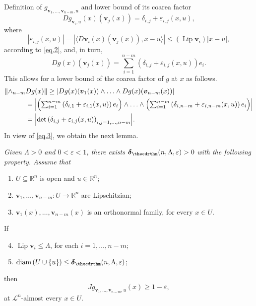 \documentclass[JEP,XML,SOM,Unicode,ThmDefs,NoEqCountersInSection]{cedram}
\newenvironment{Empty}[2][\null]{%
\begin{enonce}[remark]{#1}#2}
{\end{enonce}}
\newcommand{\R}{\mathbb{R}}
\newcommand{\Rn}{\R^n}
\newcommand{\calL}{\mathscr{L}}
\newcommand{\bdelta}{\boldsymbol{\delta}}
\newcommand{\bv}{{\boldsymbol{v}}}
\DeclareMathOperator{\rmdiam}{\mathrm{diam}}
\DeclareMathOperator{\rmLip}{\mathrm{Lip}}
\let\veps\varepsilon
\let\la\langle
\let\ra\rangle
\let\subset\subseteq
\begin{document}
\begin{Empty}[Definition of $g_{\bv_1,\ldots,\bv_{n-m},u}$ and lower bound of its coarea factor]
\begin{equation*}
Dg_{\bv_i,u}(x)(\bv_j(x)) = \delta_{i,j} + \veps_{i,j}(x,u),
\end{equation*}
where
\begin{equation}
\label{eq.3}
|\veps_{i,j}(x,u)| = \left| \la D\bv_i(x)(\bv_j(x)), x-u \ra\right| \leq \left(\rmLip \bv_i \right) |x-u|,
\end{equation}
according to \eqref{eq.2}, and, in turn,
\begin{equation*}
Dg(x)(\bv_j(x)) = \sum_{i=1}^{n-m} \left(\delta_{i,j} + \veps_{i,j}(x,u)\right) e_i.
\end{equation*}
This allows for a lower bound of the coarea factor of $g$ at $x$ as follows.
\begin{equation*}
\begin{split}
\|{\wedge}_{n-m}&Dg(x)\|  \geq \left| Dg(x)(\bv_1(x)) \wedge \ldots \wedge Dg(x)(\bv_{n-m}(x)) \right| \\
&\textstyle = \left| \left(\sum_{i=1}^{n-m} \left(\delta_{i,1} + \veps_{i,1}(x,u)\right) e_i \right) \wedge \ldots \wedge \left(\sum_{i=1}^{n-m} \left(\delta_{i,n-m} + \veps_{i,n-m}(x,u)\right) e_i \right) \right| \\
& \textstyle = \Bigl| \det \left(\delta_{i,j} + \veps_{i,j}(x,u) \right)_{i,j=1,\ldots,n-m} \Bigr|.
\end{split}
\end{equation*}
In view of \eqref{eq.3}, we obtain the next lemma.
\end{Empty}

\begin{Empty}[]
\label{jac.g}
{\it
Given $\Lambda > 0$ and $0 < \veps < 1$, there exists $\bdelta_{\thecdrthm}(n,\Lambda,\veps) > 0$ with the following property. Assume that
\begin{enumerate}
\item $U \subset \Rn$ is open and $u \in \Rn$;
\item $\bv_1,\ldots,\bv_{n-m}: U \to \Rn$ are Lipschitzian;
\item $\bv_1(x),\ldots,\bv_{n-m}(x)$ is an orthonormal family, for every $x \in U$.
\end{enumerate}
If
\begin{enumerate}\setcounter{enumi}{3}
\item $\rmLip \bv_i \leq \Lambda$, for each $i=1,\ldots,n-m$;
\item $\rmdiam \left(U \cup \{u\} \right) \leq \bdelta_{\thecdrthm}(n,\Lambda,\veps)$;
\end{enumerate}
then
\begin{equation*}
Jg_{\bv_1,\ldots,\bv_{n-m},u}(x) \geq 1 - \veps,
\end{equation*}
at $\calL^n$-almost every $x \in U$.
}
\end{Empty}
\end{document}
